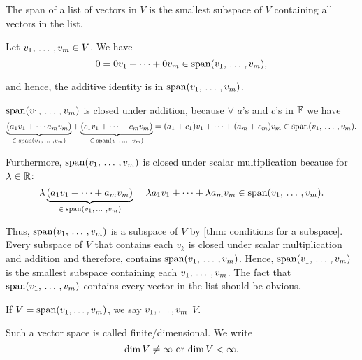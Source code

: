\begin{thm} 
  \label{thm: the span of a list of vectors is a subspace}
  The  span of a list of vectors in $V$ is the smallest subspace of $V$ containing all vectors in the list.
\end{thm}
\begin{prf}
  Let $v_1, {\, \ldots \,\,}, v_m \in V$. We have
  \begin{equation}
    0 = 0v_1 + \cdots + 0v_m \in \operatorname{span} (v_1, {\, \ldots \,\,}, v_m),
  \end{equation}

  and hence, the additive identity is in $\operatorname{span} (v_1, {\, \ldots \,\,}, v_m)$.

  $\operatorname{span} (v_1, {\, \ldots \,\,}, v_m)$ is closed under addition, because $\forall$ $a$'s and $c$'s in $\mathbb{F}$ we have
  \[
    \underbrace{(a_1 v_1 + \cdots a_m v_m)}_{\in \; \operatorname{span} (v_1, {\, \ldots \,\,}, v_m)} + \underbrace{(c_1 v_1 + \cdots + c_m v_m)}_{\in \; \operatorname{span} (v_1, {\, \ldots \,\,}, v_m)} = (a_1 + c_1)v_1 + \cdots + (a_m + c_m)v_m \in \operatorname{span} (v_1, {\, \ldots \,\,}, v_m).
  \]

  Furthermore, $\operatorname{span} (v_1, {\, \ldots \,\,}, v_m)$ is closed under scalar multiplication because for $\lambda \in \mathbb{R}$:
  \[
    \lambda \underbrace{(a_1 v_1 + \cdots + a_m v_m)}_{\in \; \operatorname{span} (v_1, {\, \ldots \,\,}, v_m)} = \lambda a_1 v_1 + \cdots + \lambda a_m v_m \in \operatorname{span} (v_1, {\, \ldots \,\,}, v_m).
  \]

  Thus, $\operatorname{span} (v_1, {\, \ldots \,\,}, v_m)$ is a subspace of $V$ by \ref{thm: conditions for a subspace}.
  Every subspace of $V$ that contains each $v_k$ is closed under scalar multiplication and addition and therefore, contains $\operatorname{span} (v_1, {\, \ldots \,\,}, v_m)$. Hence, $\operatorname{span} (v_1, {\, \ldots \,\,}, v_m)$ is the smallest subspace containing each $v_1, {\, \ldots \,\,}, v_m$. The fact that $\operatorname{span} (v_1, {\, \ldots \,\,}, v_m)$ contains every vector in the list should be obvious.
\end{prf}


\begin{mydef} 
  If $V=\operatorname{span} (v_1, \dots, v_m)$, we say $v_1, \dots, v_m$  $V$.
\end{mydef}

\setcounter{thm}{8}
\begin{mydef} 
  Such a vector space is called finite\-/dimensional. We write
  \begin{equation}
    \dim V \neq \infty$ or $\dim V < \infty.
  \end{equation}
\end{mydef}


